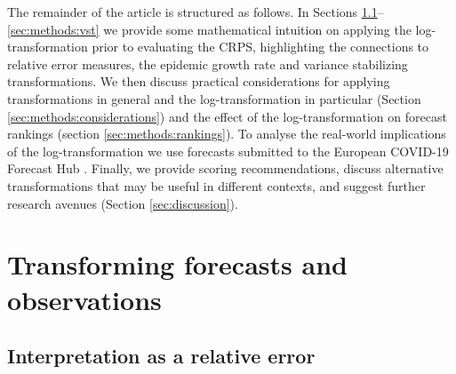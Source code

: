 \documentclass{article}
\begin{document}
The remainder of the article is structured as follows. In Sections \ref{sec:methods:relative}--\ref{sec:methods:vst} we provide some mathematical intuition on applying the log-transformation prior to evaluating the CRPS, highlighting the connections to relative error measures, the epidemic growth rate and variance stabilizing transformations.
We then discuss practical considerations for applying transformations in general and the log-transformation in particular (Section \ref{sec:methods:considerations}) and the effect of the log-transformation on forecast rankings (section \ref{sec:methods:rankings}). To analyse the real-world implications of the log-transformation we use forecasts submitted to the European COVID-19 Forecast Hub  \citep{europeancovid-19forecasthubEuropeanCovid19Forecast2021, sherrattPredictivePerformanceMultimodel2022}. Finally, we provide scoring recommendations, discuss alternative transformations that may be useful in different contexts, and suggest further research avenues (Section \ref{sec:discussion}). 


\section{Transforming forecasts and observations}
\label{sec:methods}

\subsection{Interpretation as a relative error}
\label{sec:methods:relative}
\end{document}
